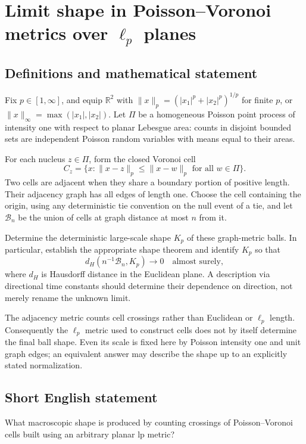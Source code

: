 \documentclass[11pt,a4paper]{article}
\begin{document}
\section*{Limit shape in Poisson–Voronoi metrics over $\ell_p$ planes}\label{statement}

\subsection{Definitions and mathematical statement}
Fix $p\in[1,\infty]$, and equip $\mathbb R^2$ with $\|x\|_p=(|x_1|^p+|x_2|^p)^{1/p}$ for finite $p$, or $\|x\|_\infty=\max(|x_1|,|x_2|)$. Let $\Pi$ be a homogeneous Poisson point process of intensity one with respect to planar Lebesgue area: counts in disjoint bounded sets are independent Poisson random variables with means equal to their areas.

For each nucleus $z\in\Pi$, form the closed Voronoi cell
\[
C_z=\{x:\|x-z\|_p\le\|x-w\|_p\text{ for all }w\in\Pi\}.
\]
Two cells are adjacent when they share a boundary portion of positive length. Their adjacency graph has all edges of length one. Choose the cell containing the origin, using any deterministic tie convention on the null event of a tie, and let $\mathcal B_n$ be the union of cells at graph distance at most $n$ from it.

Determine the deterministic large-scale shape $K_p$ of these graph-metric balls. In particular, establish the appropriate shape theorem and identify $K_p$ so that
\[
d_H(n^{-1}\mathcal B_n,K_p)\longrightarrow0
\quad\text{almost surely},
\]
where $d_H$ is Hausdorff distance in the Euclidean plane. A description via directional time constants should determine their dependence on direction, not merely rename the unknown limit.

The adjacency metric counts cell crossings rather than Euclidean or $\ell_p$ length. Consequently the $\ell_p$ metric used to construct cells does not by itself determine the final ball shape. Even its scale is fixed here by Poisson intensity one and unit graph edges; an equivalent answer may describe the shape up to an explicitly stated normalization.
\subsection{Short English statement}
What macroscopic shape is produced by counting crossings of Poisson–Voronoi cells built using an arbitrary planar lp metric?
\end{document}
